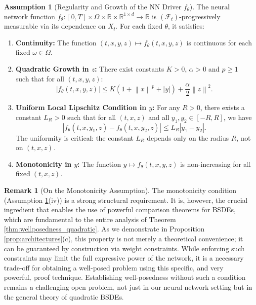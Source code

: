 \documentclass[qian]{imsart}
\newcommand{\R}{\mathbb{R}}
\newcommand{\Fcal}{\mathcal{F}}
\newcommand{\norm}[1]{\left\lVert#1\right\rVert}
\newcommand{\abs}[1]{\left\lvert#1\right\rvert}
\theoremstyle{plain}
\theoremstyle{definition}
\newtheorem{assumption}[theorem]{Assumption}
\newtheorem{remark}[theorem]{Remark}
\begin{document}
\begin{assumption}[Regularity and Growth of the NN Driver $f_\theta$]
\label{ass:f_theta_regularity_general}
The neural network function $f_\theta: [0,T] \times \Omega \times \R \times \R^{1 \times d} \to \R$ is $(\Fcal_t)$-progressively measurable via its dependence on $X_t$. For each fixed $\theta$, it satisfies:
\begin{enumerate}[label=(\roman*)]
    \item \textbf{Continuity:} The function $(t,x,y,z) \mapsto f_\theta(t,x,y,z)$ is continuous for each fixed $\omega \in \Omega$.
    \item \textbf{Quadratic Growth in $z$:} There exist constants $K > 0$, $\alpha > 0$ and $p \ge 1$ such that for all $(t,x,y,z)$:
    \[ \abs{f_\theta(t,x,y,z)} \le K(1 + \norm{x}^p + \abs{y}) + \frac{\alpha}{2}\norm{z}^2. \]
    \item \textbf{Uniform Local Lipschitz Condition in $y$:} For any $R>0$, there exists a constant $L_R > 0$ such that for all $(t,x,z)$ and all $y_1, y_2 \in [-R, R]$, we have
    \[ \abs{f_\theta(t,x,y_1,z) - f_\theta(t,x,y_2,z)} \le L_R\abs{y_1-y_2}. \]
    The uniformity is critical: the constant $L_R$ depends only on the radius $R$, not on $(t,x,z)$.
    \item \textbf{Monotonicity in $y$:} The function $y \mapsto f_\theta(t,x,y,z)$ is non-increasing for all fixed $(t,x,z)$.
\end{enumerate}
\end{assumption}

\begin{remark}[On the Monotonicity Assumption]
\label{rem:monotonicity_tradeoff_revised}
The monotonicity condition (Assumption \ref{ass:f_theta_regularity_general}(iv)) is a strong structural requirement. It is, however, the crucial ingredient that enables the use of powerful comparison theorems for BSDEs, which are fundamental to the entire analysis of Theorem \ref{thm:wellposedness_quadratic}. As we demonstrate in Proposition \ref{prop:architectures}(c), this property is not merely a theoretical convenience; it can be guaranteed by construction via weight constraints. While enforcing such constraints may limit the full expressive power of the network, it is a necessary trade-off for obtaining a well-posed problem using this specific, and very powerful, proof technique. Establishing well-posedness without such a condition remains a challenging open problem, not just in our neural network setting but in the general theory of quadratic BSDEs.
\end{remark}
\end{document}
